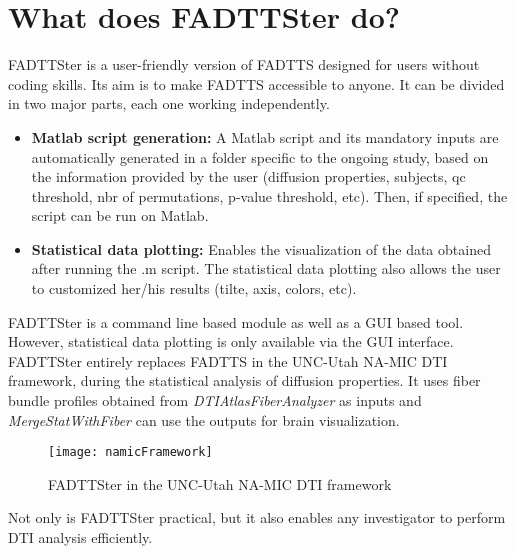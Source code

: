 \documentclass[fadttsterUserGuide_master]{subfiles}
\begin{document}
	\section{What does FADTTSter do?}
	FADTTSter is a user-friendly version of FADTTS designed for users without coding skills. Its aim is to make FADTTS accessible to anyone.
	It can be divided in two major parts, each one working independently.
	\begin{itemize}
		\item \textbf{Matlab script generation:}
		A Matlab script and its mandatory inputs are automatically generated in a folder specific to the ongoing study, based on the information provided by the user (diffusion properties, subjects, qc threshold, nbr of permutations, p-value threshold, etc). Then, if specified, the script can be run on Matlab. 
		\item \textbf{Statistical data plotting:}
		Enables the visualization of the data obtained after running the .m script. The statistical data plotting also allows the user to customized her/his results (tilte, axis, colors, etc).
	\end{itemize}
	FADTTSter is a command line based module as well as a GUI based tool. However, statistical data plotting is only available via the GUI interface.
	\newline
	FADTTSter entirely replaces FADTTS in the UNC-Utah NA-MIC DTI framework, during the statistical analysis of diffusion properties. It uses fiber bundle profiles obtained from \emph{DTIAtlasFiberAnalyzer} \citep{dti_atlas_fiber_analyzer_website} as inputs and \emph{MergeStatWithFiber} \citep{merge_stat_with_fiber_website} can use the outputs for brain visualization.
	\begin{figure}[!h]
		\centering
		\texttt{[image: namicFramework]}
		\caption{FADTTSter in the UNC-Utah NA-MIC DTI framework}
		\label{fig:namicFramework}
	\end{figure}
	\newline
	Not only is FADTTSter practical, but it also enables any investigator to perform DTI analysis efficiently.
	\vfill
\end{document}
